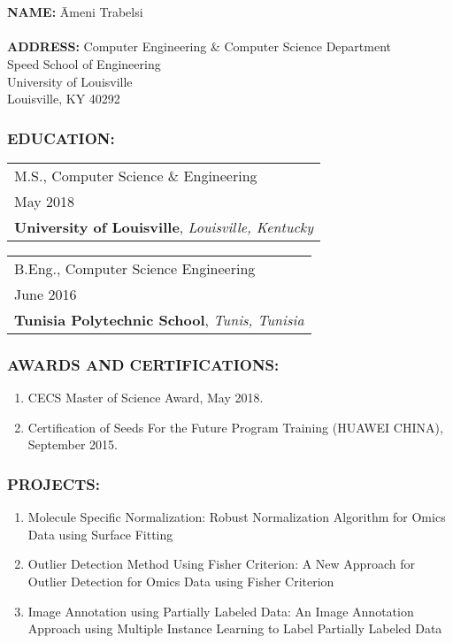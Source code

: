 \chapter*{}
\begin{tabbing}
{\bf NAME:} \hspace{5em} \= Ameni Trabelsi\\\\
{\bf ADDRESS:}  \> Computer Engineering \& Computer Science Department\\
\> Speed School of Engineering \\
\> University of Louisville \\
\> Louisville, KY 40292
\end{tabbing}
\subsection*{EDUCATION:}
\begin{description}
\item \hspace{8.5em}\begin{tabular}{l}M.S., Computer Science \& Engineering \\
May 2018\\
\textbf{University of Louisville}, \emph{Louisville, Kentucky}\end{tabular}
\item \hspace{8.5em}\begin{tabular}{l}B.Eng., Computer Science Engineering\\
June 2016\\
\textbf{Tunisia Polytechnic School},
\emph{Tunis, Tunisia}\end{tabular}
\end{description}

\subsection*{AWARDS AND CERTIFICATIONS:}
\begin{enumerate}
	 \item CECS Master of Science Award, May 2018.
 	\item Certification of Seeds For the Future Program Training (HUAWEI CHINA), September 2015.
\end{enumerate}
\subsection*{PROJECTS:}
\begin{enumerate}
	\item Molecule Specific Normalization: Robust Normalization Algorithm for Omics Data using Surface Fitting
	\item Outlier Detection Method Using Fisher Criterion: A New Approach for Outlier Detection for Omics Data using Fisher Criterion
	\item Image Annotation using Partially Labeled Data: An Image Annotation Approach using Multiple Instance Learning to Label Partially Labeled Data
	
\end{enumerate}
\cleardoublepage